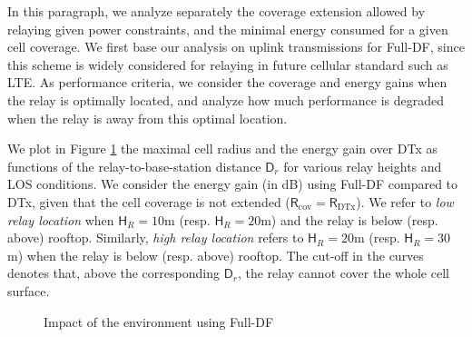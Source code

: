 \documentclass[journal]{IEEEtran}
\theoremstyle{definition}
\begin{document}
In this paragraph, we analyze separately the coverage extension allowed by relaying given power constraints, and the minimal energy consumed for a given cell coverage.
We first base our analysis on uplink transmissions for Full-DF, since this scheme is widely considered for relaying in future cellular standard such as LTE. As performance criteria, we consider the coverage and energy gains when the relay is optimally located, and analyze how much performance is degraded when the relay is away from this optimal location.

We plot in Figure \ref{fig:Perf_FullDF} the maximal cell radius and the energy gain over DTx as functions of the relay-to-base-station distance $\mathsf{D}_r$ for various relay heights and LOS conditions.
We consider the energy gain (in dB) using Full-DF compared to DTx, given that the cell coverage is not extended ($\mathsf{R}_{\text{cov}}= \mathsf{R}_{\text{DTx}}$). 
We refer to \textit{low relay location} when $\mathsf{H}_{R} = 10$m (resp. $\mathsf{H}_{R} = 20$m) and the relay is below (resp. above) rooftop. Similarly, \textit{high relay location} refers to $\mathsf{H}_{R} = 20$m (resp. $\mathsf{H}_{R} = 30$m) when the relay is below (resp. above) rooftop.
The cut-off in the curves denotes that, above the corresponding $\mathsf{D}_r$, the relay cannot cover the whole cell surface.

\begin{figure}
	{\centering 
	\caption{Impact of the environment using Full-DF}  
	\label{fig:Perf_FullDF} 
	}
\end{figure}
\end{document}
